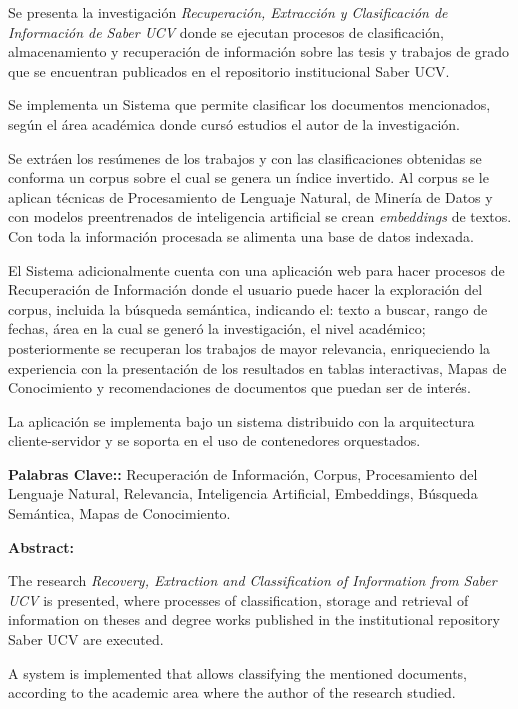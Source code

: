 Se presenta la investigación \emph{Recuperación, Extracción y Clasificación de Información de Saber UCV} donde se ejecutan procesos de clasificación, almacenamiento y recuperación de información sobre las tesis y trabajos de grado que se encuentran publicados en el repositorio institucional Saber UCV.

Se implementa un Sistema que permite clasificar los documentos mencionados, según el área académica donde cursó estudios el autor de la investigación.

Se extráen los resúmenes de los trabajos y con las clasificaciones obtenidas se conforma un corpus sobre el cual se genera un índice invertido. Al corpus se le aplican técnicas de Procesamiento de Lenguaje Natural, de Minería de Datos y con modelos preentrenados de inteligencia artificial se crean  \textit{embeddings} de textos. Con toda la información procesada se alimenta una base de datos indexada.

El Sistema adicionalmente cuenta con una aplicación web para hacer procesos de Recuperación de Información donde el usuario puede hacer la exploración del corpus, incluida la búsqueda semántica, indicando el: texto a buscar, rango de fechas, área en la cual se generó la investigación, el nivel académico; posteriormente se recuperan los trabajos de mayor relevancia, enriqueciendo la experiencia con la presentación de los resultados en tablas interactivas, Mapas de Conocimiento y recomendaciones de documentos que puedan ser de interés.

La aplicación se implementa bajo un sistema distribuido con la arquitectura cliente-servidor y se soporta en el uso de contenedores orquestados.

\vspace*{2cm}

\textbf{Palabras Clave::} Recuperación de Información, Corpus, Procesamiento del Lenguaje Natural, Relevancia, Inteligencia Artificial, Embeddings, Búsqueda Semántica, Mapas de Conocimiento.



\newpage
\thispagestyle{empty}
\large{\textbf{Abstract:}}

The research \emph{Recovery, Extraction and Classification of Information from Saber UCV} is presented, where processes of classification, storage and retrieval of information on theses and degree works published in the institutional repository Saber UCV are executed.

A system is implemented that allows classifying the mentioned documents, according to the academic area where the author of the research studied.

